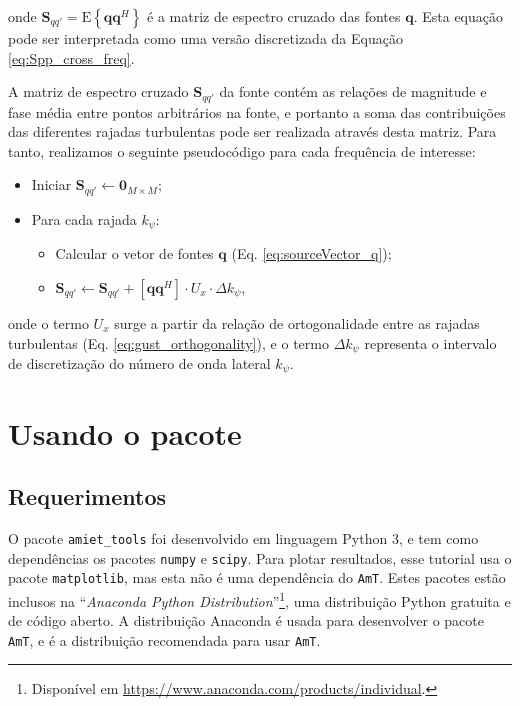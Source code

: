 \documentclass[a4paper, 11pt, twoside]{article}
\newcommand{\AmT}{\texttt{AmT}}
\begin{document}
\noindent onde $\mathbf{S}_{qq'} = \mathrm{E} \left\{ \mathbf{q} \mathbf{q}^H \right\}$ é a matriz de espectro cruzado das fontes $\mathbf{q}$. Esta equação pode ser interpretada como uma versão discretizada da Equação \ref{eq:Spp_cross_freq}.

A matriz de espectro cruzado $\mathbf{S}_{qq'}$ da fonte contém as relações de magnitude e fase média entre pontos arbitrários na fonte, e portanto a soma das contribuições das diferentes rajadas turbulentas pode ser realizada através desta matriz. Para tanto, realizamos o seguinte pseudocódigo para cada frequência de interesse:

\begin{itemize}
	\item Iniciar $\mathbf{S}_{qq'} \leftarrow \mathbf{0}_{M \times M}$;
	\item Para cada rajada $k_\psi$:
	\begin{itemize}
		\item Calcular o vetor de fontes $\mathbf{q}$ (Eq. \ref{eq:sourceVector_q});
		\item $\mathbf{S}_{qq'} \leftarrow \mathbf{S}_{qq'} + \left[ \mathbf{q} \mathbf{q}^H \right] \cdot U_x \cdot \Delta k_\psi$,
	\end{itemize}
\end{itemize}

\noindent onde o termo $U_x$ surge a partir da relação de ortogonalidade entre as rajadas turbulentas (Eq. \ref{eq:gust_orthogonality}), e o termo $\Delta k_\psi$ representa o intervalo de discretização do número de onda lateral $k_\psi$.



\clearpage
\newpage
\section{Usando o pacote}
\label{Sec:UsingThePackage}

\subsection{Requerimentos}

O pacote \verb|amiet_tools| foi desenvolvido em linguagem Python 3, e tem como dependências os pacotes \verb|numpy| e \verb|scipy|. Para plotar resultados, esse tutorial usa o pacote \verb|matplotlib|, mas esta não é uma dependência do \AmT{}. Estes pacotes estão inclusos na ``\emph{Anaconda Python Distribution}''\footnote{Disponível em \url{https://www.anaconda.com/products/individual}.}, uma distribuição Python gratuita e de código aberto. A distribuição Anaconda é usada para desenvolver o pacote \AmT{}, e é a distribuição recomendada para usar \AmT{}.
\end{document}
